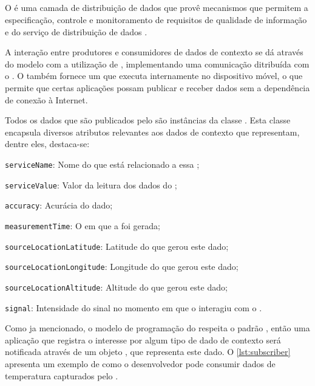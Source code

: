 \subsection{\cddl} \label{subsec:cddl}

O \cddl é uma camada de distribuição de dados que provê mecanismos que permitem a especificação, controle e monitoramento de requisitos de qualidade de informação e do serviço de distribuição de dados \cite{gomes:2017}.

A interação entre produtores e consumidores de dados de contexto se dá através do modelo \pubsub com a utilização de \brokers, implementando uma comunicação ditribuída com o \mqtt. O \cddl também fornece um \ubroker que executa internamente no dispositivo móvel, o que permite que certas aplicações possam publicar e receber dados sem a dependência de conexão à Internet.

Todos os dados que são publicados pelo \cddl são instâncias da classe \msg.
Esta classe encapsula diversos atributos relevantes aos dados de contexto que representam, dentre eles, destaca-se:

\begin{alineas}
	\item \texttt{serviceName}: Nome do \smartobj que está relacionado a essa \msg;

	\item \texttt{serviceValue}: Valor da leitura dos dados do \smartobj;

	\item \texttt{accuracy}: Acurácia do dado;

	\item \texttt{measurementTime}: O \timestamp em que a \msg foi gerada;

	\item \texttt{sourceLocationLatitude}: Latitude do \mhub que gerou este dado;

	\item \texttt{sourceLocationLongitude}: Longitude do \mhub que gerou este dado;

	\item \texttt{sourceLocationAltitude}: Altitude do \mhub que gerou este dado;

	\item \texttt{signal}: Intensidade do sinal no momento em que o \smartobj interagiu com o \stwopa.
\end{alineas}

Como ja mencionado, o modelo de programação do \cddl respeita o padrão \pubsub, então uma aplicação que registra o interesse por algum tipo de dado de contexto será notificada através de um objeto \msg, que representa este dado.
O \autoref{lst:subscriber} apresenta um exemplo de como o desenvolvedor pode consumir dados de temperatura capturados pelo \middleware.

